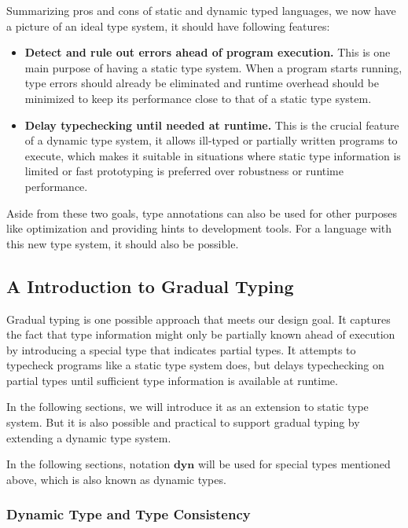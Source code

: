 Summarizing pros and cons of static and dynamic typed languages,
we now have a picture of an ideal type system, it should have following features:

\begin{itemize}
	\item \textbf{Detect and rule out errors ahead of program execution.} This is one main purpose of having a static type system. When a program starts running,
	type errors should already be eliminated and runtime overhead should be minimized
	to keep its performance close to that of a static type system.
	\item \textbf{Delay typechecking until needed at runtime.}
	This is the crucial feature of a dynamic type system,
	it allows ill-typed or partially written programs to execute,
	which makes it suitable in situations where static type information
	is limited or fast prototyping is preferred over robustness or runtime performance.
\end{itemize}

Aside from these two goals, type annotations can also be used for
other purposes like optimization and providing hints to development tools.
For a language with this new type system, it should also be possible.

\subsection{A Introduction to Gradual Typing}

\newcommand{\dyn}{\textbf{dyn}}

Gradual typing is one possible approach that meets our design goal.
It captures the fact that type information might only be partially known
ahead of execution by introducing a special type that indicates partial types.
It attempts to typecheck programs like a static type system does, but delays
typechecking on partial types until sufficient type information is available
at runtime.

In the following sections, we will introduce it
as an extension to static type system.
But it is also possible and practical to support gradual typing by
extending a dynamic type system.

In the following sections, notation $\dyn$ will be used for
special types mentioned above, which is also known as dynamic types.

\subsubsection{Dynamic Type and Type Consistency}

